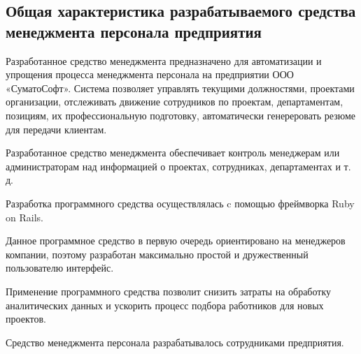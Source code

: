 \subsection{Общая характеристика разрабатываемого средства менеджмента персонала предприятия}
\label{sec:economics:characteristics}

Разработанное средство менеджмента предназначено для автоматизации и упрощения процесса менеджмента персонала на
предприятии ООО «СуматоСофт». Система позволяет управлять текущими должностями, проектами организации, отслеживать
движение сотрудников по проектам, департаментам, позициям, их профессиональную подготовку, автоматически генереровать
резюме для передачи клиентам.

Разработанное средство менеджмента обеспечивает контроль менеджерам или администраторам над информацией о проектах,
сотрудниках, департаментах и т. д.

Разработка программного средства осуществлялась c помощью фреймворка Ruby on Rails.

Данное программное средство в первую очередь ориентировано на менеджеров компании, поэтому разработан максимально
простой и дружественный пользователю интерфейс.

Применение программного средства позволит снизить затраты на обработку аналитических данных и ускорить процесс подбора
работников для новых проектов.

Средство менеджмента персонала разрабатывалось сотрудниками предприятия.
